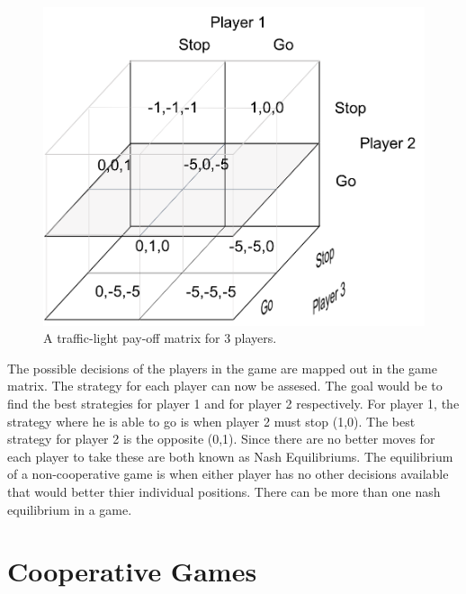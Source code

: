 \documentclass[phd, 12pt, print]{fauthesis}
\begin{document}
\begin{figure}[th]
  \centering
  \includegraphics[width=5.0in]{Figures/3way_intersection}
  \caption[A 3-Player Pay-off Matrix]{A traffic-light pay-off matrix for 3 players.}
  \label{fig:Pay-offMatrixfor3Players}
\end{figure}


The possible decisions of the players in the game are
mapped out in the game matrix. The strategy for each player 
can now be assesed. The goal would be to find the best strategies
for player 1 and for player 2 respectively. For player 1, 
the strategy where he is able to go is when player 2 must stop
(1,0). The best strategy for player 2 is the opposite (0,1).
Since there are no better moves for each player to take these 
are both known as Nash Equilibriums. The equilibrium of a non-cooperative
game is when either player has no other decisions available that 
would better thier individual positions. There can be more than 
one nash equilibrium in a game.


\section{Cooperative Games}
\end{document}
